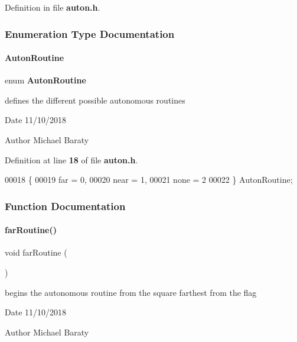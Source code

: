 Definition in file \textbf{ auton.\+h}.



\subsubsection{Enumeration Type Documentation}
\mbox{\label{auton_8h_a1730ff50964147a555aa689ea5a64aaf}} 
\paragraph{Auton\+Routine}
{\footnotesize\ttfamily enum \textbf{ Auton\+Routine}}



defines the different possible autonomous routines 

\begin{DoxyDate}{Date}
11/10/2018 
\end{DoxyDate}
\begin{DoxyAuthor}{Author}
Michael Baraty 
\end{DoxyAuthor}


Definition at line \textbf{ 18} of file \textbf{ auton.\+h}.


\begin{DoxyCode}
00018              \{
00019   far = 0,
00020   near = 1,
00021   none = 2
00022 \} AutonRoutine;
\end{DoxyCode}


\subsubsection{Function Documentation}
\mbox{\label{auton_8h_a03a34944509a90384c5e0d7494c762ce}} 
\paragraph{far\+Routine()}
{\footnotesize\ttfamily void far\+Routine (\begin{DoxyParamCaption}{ }\end{DoxyParamCaption})}



begins the autonomous routine from the square farthest from the flag 

\begin{DoxyDate}{Date}
11/10/2018 
\end{DoxyDate}
\begin{DoxyAuthor}{Author}
Michael Baraty 
\end{DoxyAuthor}


